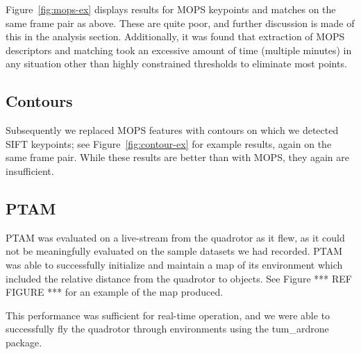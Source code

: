\documentclass{acmsiggraph}
\begin{document}
Figure~\ref{fig:mops-ex} displays results for MOPS keypoints and matches on the same frame pair as above. These are quite poor, and further discussion is made of this in the analysis section. Additionally, it was found that extraction of MOPS descriptors and matching took an excessive amount of time (multiple minutes) in any situation other than highly constrained thresholds to eliminate most points.

\subsection{Contours}
Subsequently we replaced MOPS features with contours on which we detected SIFT keypoints; see Figure~\ref{fig:contour-ex} for example results, again on the same frame pair. While these results are better than with MOPS, they again are insufficient.

\subsection{PTAM}
PTAM was evaluated on a live-stream from the quadrotor as it flew, as it could not be meaningfully evaluated on the sample datasets we had recorded. PTAM was able to successfully initialize and maintain a map of its environment which included the relative distance from the quadrotor to objects. See Figure *** REF FIGURE *** for an example of the map produced.

This performance was sufficient for real-time operation, and we were able to successfully fly the quadrotor through environments using the tum\_ardrone package.
\end{document}
